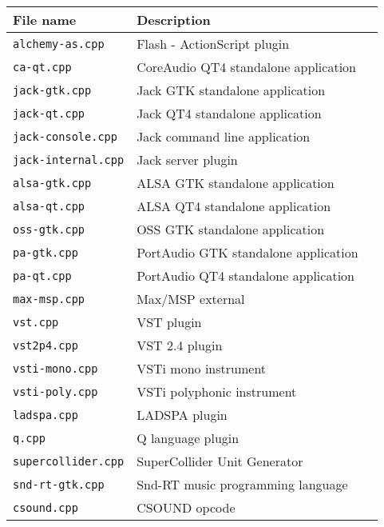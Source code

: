 \begin{table}[htdp]
\begin{center}
\begin{tabular}{|l|l|l|}
\hline
\textbf{File name}			& \textbf{Description}   \\
\hline
\texttt{alchemy-as.cpp} 	& Flash - ActionScript plugin \\
\texttt{ca-qt.cpp} 			& CoreAudio QT4 standalone application  \\
\texttt{jack-gtk.cpp} 		& Jack GTK standalone application  \\
\texttt{jack-qt.cpp} 		& Jack QT4 standalone application  \\
\texttt{jack-console.cpp} 	& Jack command line application  \\
\texttt{jack-internal.cpp} 	& Jack server plugin  \\
\texttt{alsa-gtk.cpp} 		& ALSA GTK standalone application  \\
\texttt{alsa-qt.cpp} 		& ALSA QT4 standalone application  \\
\texttt{oss-gtk.cpp} 		& OSS GTK standalone application  \\
\texttt{pa-gtk.cpp} 		& PortAudio GTK standalone application  \\
\texttt{pa-qt.cpp} 			& PortAudio QT4 standalone application  \\
\hline
\texttt{max-msp.cpp} 		& Max/MSP external  \\
\texttt{vst.cpp} 			& VST plugin  \\
\texttt{vst2p4.cpp} 		& VST 2.4 plugin  \\
\texttt{vsti-mono.cpp} 		& VSTi mono instrument  \\
\texttt{vsti-poly.cpp} 		& VSTi polyphonic instrument  \\
\texttt{ladspa.cpp} 		& LADSPA plugin  \\
\texttt{q.cpp} 				& Q language plugin  \\
\texttt{supercollider.cpp} 	& SuperCollider Unit Generator  \\
\texttt{snd-rt-gtk.cpp} 	& Snd-RT music programming language  \\
\texttt{csound.cpp} 		& CSOUND opcode  \\

\end{tabular}
\end{center}
\end{table}
